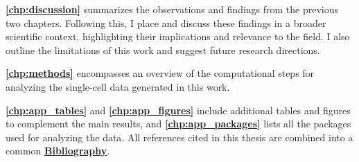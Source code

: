 
\par \textbf{\autoref{chp:discussion}} summarizes the observations and findings from the previous two chapters. Following this, I place and discuss these findings in a broader scientific context, highlighting their implications and relevance to the field. I also outline the limitations of this work and suggest future research directions.\\

\par \textbf{\autoref{chp:methods}} encompasses an overview of the computational steps for analyzing the single-cell data generated in this work.\\

\par \textbf{\autoref{chp:app_tables}} and \textbf{\autoref{chp:app_figures}} include additional tables and figures to complement the main results, and \textbf{\autoref{chp:app_packages}} lists all the packages used for analyzing the data. All references cited in this thesis are combined into a common \hyperref[bibliography]{\textbf{Bibliography}}. 







